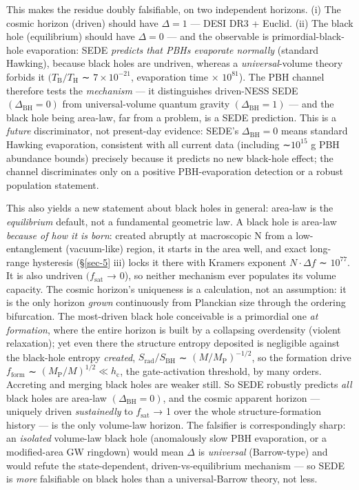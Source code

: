 \documentclass[aps,prd,preprint,nofootinbib,superscriptaddress]{revtex4-2}
\begin{document}
This makes the residue doubly falsifiable, on two independent horizons.
(i) The cosmic horizon (driven) should have \(\Delta  = 1\) --- DESI DR3
+ Euclid. (ii) The black hole (equilibrium) should have \(\Delta  = 0\)
--- and the observable is primordial-black-hole evaporation: SEDE
\emph{predicts that PBHs evaporate normally} (standard Hawking), because
black holes are undriven, whereas a \emph{universal}-volume theory
forbids it \((T_{\mathrm{B}}/T_{\mathrm{H}}\) ∼ \(7\times 10^{-21}\),
evaporation time × \(10^{81}\)). The PBH channel therefore tests the
\emph{mechanism} --- it distinguishes driven-NESS SEDE
\((\Delta _\mathrm{BH} = 0)\) from universal-volume quantum gravity
\((\Delta _\mathrm{BH} = 1)\) --- and the black hole being area-law, far
from a problem, is a SEDE prediction. This is a \emph{future}
discriminator, not present-day evidence: SEDE's
\(\Delta _\mathrm{BH} = 0\) means standard Hawking evaporation,
consistent with all current data (including ∼\(10^{15}\) g PBH abundance
bounds) precisely because it predicts no new black-hole effect; the
channel discriminates only on a positive PBH-evaporation detection or a
robust population statement.

This also yields a new statement about black holes in general: area-law
is the \emph{equilibrium} default, not a fundamental geometric law. A
black hole is area-law \emph{because of how it is born}: created
abruptly at macroscopic N from a low-entanglement (vacuum-like) region,
it starts in the area well, and exact long-range hysteresis
(§\ref{sec-5} iii) locks it there with Kramers exponent
\(N\cdot \Delta f\) ∼ \(10^{77}\). It is also undriven
\((f_{\mathrm{sat}}\) → 0), so neither mechanism ever populates its
volume capacity. The cosmic horizon's uniqueness is a calculation, not
an assumption: it is the only horizon \emph{grown} continuously from
Planckian size through the ordering bifurcation. The most-driven black
hole conceivable is a primordial one \emph{at formation}, where the
entire horizon is built by a collapsing overdensity (violent
relaxation); yet even there the structure entropy deposited is
negligible against the black-hole entropy \emph{created},
\(S_{\mathrm{rad}}/S_\mathrm{BH}\) ∼ \((M/M_{\mathrm{P}})^{-1/2}\), so
the formation drive \(f_{\mathrm{form}}\) ∼
\((M_{\mathrm{P}}/M)^{1/2} \ll  h_{\mathrm{c}}\), the gate-activation
threshold, by many orders. Accreting and merging black holes are weaker
still. So SEDE robustly predicts \emph{all} black holes are area-law
\((\Delta _\mathrm{BH} = 0)\), and the cosmic apparent horizon ---
uniquely driven \emph{sustainedly} to \(f_{\mathrm{sat}}\) → 1 over the
whole structure-formation history --- is the only volume-law horizon.
The falsifier is correspondingly sharp: an \emph{isolated} volume-law
black hole (anomalously slow PBH evaporation, or a modified-area GW
ringdown) would mean \(\Delta\) is \emph{universal} (Barrow-type) and
would refute the state-dependent, driven-vs-equilibrium mechanism --- so
SEDE is \emph{more} falsifiable on black holes than a universal-Barrow
theory, not less.
\end{document}
